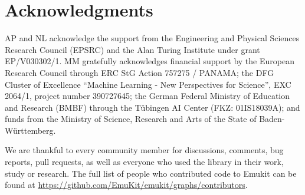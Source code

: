 \section{Acknowledgments}
AP and NL acknowledge the support from the Engineering and Physical Sciences Research Council (EPSRC) and the Alan Turing Institute under grant EP/V030302/1. MM gratefully acknowledges financial support by the European Research Council through ERC StG Action 757275 / PANAMA; the DFG Cluster of Excellence “Machine Learning - New Perspectives for Science”, EXC 2064/1, project number 390727645; the German Federal Ministry of Education and Research (BMBF) through the T\"{u}bingen AI Center (FKZ: 01IS18039A); and funds from the Ministry of Science, Research and Arts of the State of Baden-W\"{u}rttemberg.

We are thankful to every community member for discussions, comments, bug reports, pull requests, as well as everyone who used the library in their work, study or research. The full list of people who contributed code to Emukit can be found at \url{https://github.com/EmuKit/emukit/graphs/contributors}.


